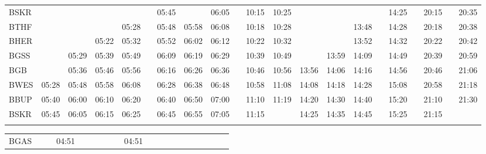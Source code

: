 \begin{center}
\begin{tabular}
\begin{tabular}
\begin{tabular}{!{\color{lightbrown}\vrule width 3pt}l!{\color{lightbrown}\vrule width 3pt}*{19}{c|}c!{\color{lightbrown}\vrule width 3pt}}
\hline
{}
 \\
\hline
BSKR            & 
      &       &       &       &          & 05:45 &       & 06:05 &  & 10:15 & 10:25 &       &       &       &          & 14:25 &  & 20:15 &  & 20:35 \\
BTHF            & 
      &       &       & 05:28 &  & 05:48 & 05:58 & 06:08 & \lbr{}   & 10:18 & 10:28 &       &       & 13:48 &  & 14:28 & \lbr{}   & 20:18 & \lbr{}   & 20:38 \\
BHER            & 
      &       & 05:22 & 05:32 & \lbr{}   & 05:52 & 06:02 & 06:12 & \lbr{}   & 10:22 & 10:32 &       &       & 13:52 & \lbr{}   & 14:32 & \lbr{}   & 20:22 & \lbr{}   & 20:42 \\
BGSS            & 
      & 05:29 & 05:39 & 05:49 & \lbr{}   & 06:09 & 06:19 & 06:29 & \lbr{}   & 10:39 & 10:49 &       & 13:59 & 14:09 & \lbr{}   & 14:49 & \lbr{}   & 20:39 & \lbr{}   & 20:59 \\
BGB             & 
      & 05:36 & 05:46 & 05:56 & \lbr{}   & 06:16 & 06:26 & 06:36 & \lbr{}   & 10:46 & 10:56 & 13:56 & 14:06 & 14:16 & \lbr{}   & 14:56 & \lbr{}   & 20:46 & \lbr{}   & 21:06 \\
BWES            & 
05:28 & 05:48 & 05:58 & 06:08 & \lbr{}   & 06:28 & 06:38 & 06:48 & \lbr{}   & 10:58 & 11:08 & 14:08 & 14:18 & 14:28 & \lbr{}   & 15:08 & \lbr{}   & 20:58 & \lbr{}   & 21:18 \\
BBUP            & 
05:40 & 06:00 & 06:10 & 06:20 & \lbr{}   & 06:40 & 06:50 & 07:00 & \lbr{}   & 11:10 & 11:19 & 14:20 & 14:30 & 14:40 & \lbr{}   & 15:20 & \lbr{}   & 21:10 & \lbr{}   & 21:30 \\
BSKR            & 
05:45 & 06:05 & 06:15 & 06:25 & \lbr{}   & 06:45 & 06:55 & 07:05 & \lbr{}   & 11:15 &       & 14:25 & 14:35 & 14:45 & \lbr{}   & 15:25 & \lbr{}   & 21:15 &          &       \\
\myhline
\end{tabular}
\fi
\fi
\ifulrich
\begin{tabular}{!{\color{mbrown}\vrule width 3pt}l!{\color{mbrown}\vrule width 3pt}*{5}{c|}c!{\color{mbrown}\vrule width 3pt}
*{6}{c|}c!{\color{mbrown}\vrule width 3pt}*{5}{c|}c!{\color{mbrown}\vrule width 3pt}}
\hline
{}
 &  &  \\
\hline
BGAS     &
      &       & 04:51 &       &          &       &
      &       & 04:51 &       &       &          &       &

\end{tabular}
\end{tabular}
\end{tabular}
\end{center}
